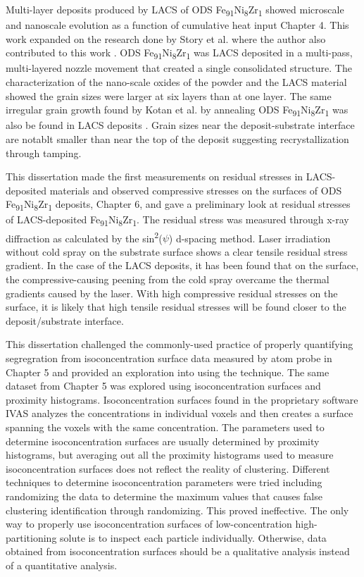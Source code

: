 	Multi-layer deposits produced by LACS of ODS Fe\textsubscript{91}Ni\textsubscript{8}Zr\textsubscript{1} showed microscale and nanoscale evolution as a function of cumulative heat input Chapter 4. This work expanded on the research done by Story et al. where the author also contributed to this work \cite{RN383}. ODS Fe\textsubscript{91}Ni\textsubscript{8}Zr\textsubscript{1} was LACS deposited in a multi-pass, multi-layered nozzle movement that created a single consolidated structure. The characterization of the nano-scale oxides of the powder and the LACS material showed the grain sizes were larger at six layers than at one layer. The same irregular grain growth found by Kotan et al. by annealing ODS Fe\textsubscript{91}Ni\textsubscript{8}Zr\textsubscript{1} was also be found in LACS deposits \cite{RN740}. Grain sizes near the deposit-substrate interface are notablt smaller than near the top of the deposit suggesting recrystallization through tamping.
	
	This dissertation made the first measurements on residual stresses in LACS-deposited materials and observed compressive stresses on the surfaces of ODS Fe\textsubscript{91}Ni\textsubscript{8}Zr\textsubscript{1} deposits, Chapter 6, and gave a preliminary look at residual stresses of LACS-deposited Fe\textsubscript{91}Ni\textsubscript{8}Zr\textsubscript{1}. The residual stress was measured through x-ray diffraction as calculated by the sin\textsuperscript{2}($ \psi$) d-spacing method. Laser irradiation without cold spray on the substrate surface shows a clear tensile residual stress gradient. In the case of the LACS deposits, it has been found that on the surface, the compressive-causing peening from the cold spray overcame the thermal gradients caused by the laser. With high compressive residual stresses on the surface, it is likely that high tensile residual stresses will be found closer to the deposit/substrate interface. 
	
	This dissertation challenged the commonly-used practice of properly quantifying segregration from isoconcentration surface data measured by atom probe in Chapter 5 and provided an exploration into using the technique. The same dataset from Chapter 5 was explored using isoconcentration surfaces and proximity histograms. Isoconcentration surfaces found in the proprietary software IVAS analyzes the concentrations in individual voxels and then creates a surface spanning the voxels with the same concentration. The parameters used to determine isoconcentration surfaces are usually determined by proximity histograms, but averaging out all the proximity histograms used to measure isoconcentration surfaces does not reflect the reality of clustering. Different techniques to determine isoconcentration parameters were tried including randomizing the data to determine the maximum values that causes false clustering identification through randomizing. This proved ineffective. The only way to properly use isoconcentration surfaces of low-concentration high-partitioning solute is to inspect each particle individually. Otherwise, data obtained from isoconcentration surfaces should be a qualitative analysis instead of a quantitative analysis.
	
